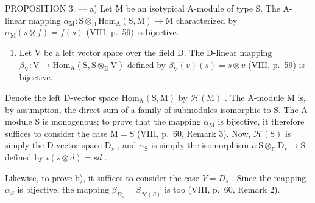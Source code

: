PROPOSITION 3. --- a) Let M be an isotypical A-module of type S. The A-linear mapping \(\alpha_{\mathrm{M}}: \mathrm{S} \otimes_{\mathrm{D}} \mathrm{Hom}_{\mathrm{A}}(\mathrm{S}, \mathrm{M}) \to \mathrm{M}\) characterized by \(\alpha_{\mathrm{M}}(s \otimes f) = f(s)\) (VIII, p.~59) is bijective.

\begin{enumerate}
\def\labelenumi{\alph{enumi})}
\setcounter{enumi}{1}
\tightlist
\item
  Let V be a left vector space over the field D. The D-linear mapping \(\beta_{\mathrm{V}}: \mathrm{V} \to \mathrm{Hom}_{\mathrm{A}}(\mathrm{S}, \mathrm{S} \otimes_{\mathrm{D}} \mathrm{V})\) defined by \(\beta_{\mathrm{V}}(v)(s) = s \otimes v\) (VIII, p.~59) is bijective.
\end{enumerate}

Denote the left D-vector space \(\mathrm{Hom}_{\mathrm{A}}(\mathrm{S},\mathrm{M})\) by \(\mathcal{H}(\mathrm{M})\) . The A-module M is, by assumption, the direct sum of a family of submodules isomorphic to S. The A-module S is monogenous; to prove that the mapping \(\alpha_{\mathrm{M}}\) is bijective, it therefore suffices to consider the case \(\mathrm{M} = \mathrm{S}\) (VIII, p.~60, Remark 3). Now, \(\mathcal{H}(\mathrm{S})\) is simply the D-vector space \(\mathrm{D}_s\) , and \(\alpha_{\mathrm{S}}\) is simply the isomorphism \(\iota : \mathrm{S} \otimes_{\mathrm{D}} \mathrm{D}_s \to \mathrm{S}\) defined by \(\iota(s \otimes d) = sd\) .

Likewise, to prove b), it suffices to consider the case \(V = D_{s}\) . Since the mapping \(\alpha_{S}\) is bijective, the mapping \(\beta_{D_{s}} = \beta_{\mathcal{H}(S)}\) is too (VIII, p.~60, Remark 2).

